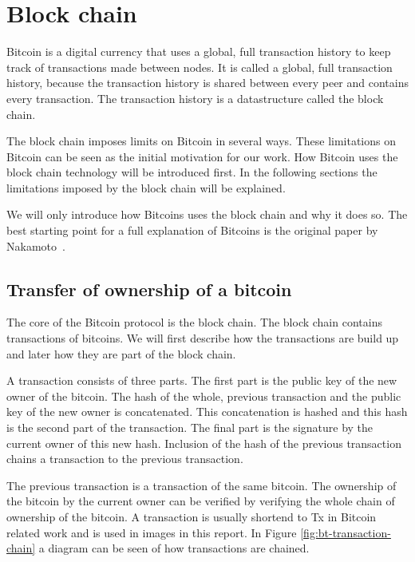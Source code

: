 \section{Block chain}
\label{sect:bitcoin}
Bitcoin is a digital currency that uses a global, full transaction history
to keep track of transactions made between nodes.
It is called a global, full transaction history,
because the transaction history is shared between every peer and contains every transaction.
The transaction history is a datastructure called the block chain.

The block chain imposes limits on Bitcoin in several ways.
These limitations on Bitcoin can be seen as the initial motivation for our work.
How Bitcoin uses the block chain technology will be introduced first.
In the following sections the limitations imposed by the block chain will be explained.

We will only introduce how Bitcoins uses the block chain and why it does so.
The best starting point for a full explanation of Bitcoins
is the original paper by Nakamoto~\cite{Nakamoto-bitcoin}.

\subsection{Transfer of ownership of a bitcoin}
The core of the Bitcoin protocol is the block chain.
The block chain contains transactions of bitcoins.
We will first describe how the transactions are build up
and later how they are part of the block chain.

A transaction consists of three parts.
The first part is the public key of the new owner of the bitcoin.
The hash of the whole, previous transaction and the public key of the new owner is concatenated.
This concatenation is hashed and this hash is the second part of the transaction.
The final part is the signature by the current owner of this new hash.
Inclusion of the hash of the previous transaction chains a transaction to the previous transaction.

The previous transaction is a transaction of the same bitcoin.
The ownership of the bitcoin by the current owner can be verified
by verifying the whole chain of ownership of the bitcoin.
A transaction is usually shortend to Tx in Bitcoin related work and is used in images in this report.
In Figure \ref{fig:bt-transaction-chain} a diagram can be seen of how transactions are chained.

